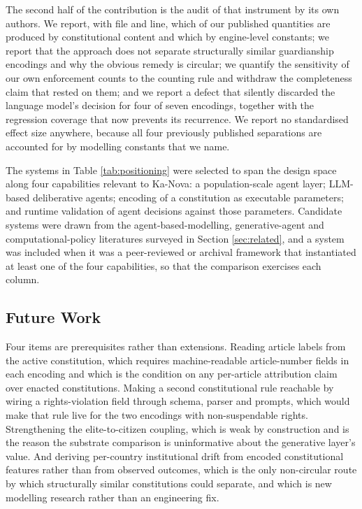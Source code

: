 \documentclass{ieeeaccess}
\begin{document}
The second half of the contribution is the audit of that instrument by
its own authors. We report, with file and line, which of our published
quantities are produced by constitutional content and which by
engine-level constants; we report that the approach does not separate
structurally similar guardianship encodings and why the obvious remedy
is circular; we quantify the sensitivity of our own enforcement counts to
the counting rule and withdraw the completeness claim that rested on
them; and we report a defect that silently discarded the language
model's decision for four of seven encodings, together with the
regression coverage that now prevents its recurrence. We report no
standardised effect size anywhere, because all four previously published
separations are accounted for by modelling constants that we name.

The systems in Table \ref{tab:positioning} were selected to span the
design space along four capabilities relevant to Ka-Nova: a
population-scale agent layer; LLM-based deliberative agents; encoding of
a constitution as executable parameters; and runtime validation of agent
decisions against those parameters. Candidate systems were drawn from
the agent-based-modelling, generative-agent and computational-policy
literatures surveyed in Section \ref{sec:related}, and a system was
included when it was a peer-reviewed or archival framework that
instantiated at least one of the four capabilities, so that the
comparison exercises each column.

\subsection{Future Work}
Four items are prerequisites rather than extensions. Reading article
labels from the active constitution, which requires machine-readable
article-number fields in each encoding and which is the condition on any
per-article attribution claim over enacted constitutions. Making a
second constitutional rule reachable by wiring a rights-violation field
through schema, parser and prompts, which would make that rule live for
the two encodings with non-suspendable rights. Strengthening the
elite-to-citizen coupling, which is weak by construction and is the
reason the substrate comparison is uninformative about the generative
layer's value. And deriving per-country institutional drift from encoded
constitutional features rather than from observed outcomes, which is the
only non-circular route by which structurally similar constitutions
could separate, and which is new modelling research rather than an
engineering fix.
\end{document}
